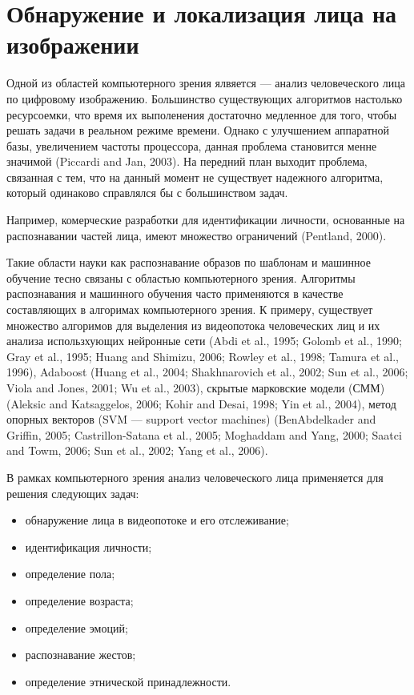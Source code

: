 \section{Обнаружение и локализация лица на изображении}
Одной из областей компьютерного зрения ялвяется --- анализ человеческого лица по цифровому изображению.
Большинство существующих алгоритмов настолько ресурсоемки, что время их выполенения достаточно медленное для того, чтобы решать задачи в реальном режиме времени.
Однако с улучшением аппаратной базы, увеличением частоты процессора, данная проблема становится менне значимой (Piccardi and Jan, 2003).
На передний план выходит проблема, связанная с тем, что на данный момент не существует надежного алгоритма, который одинаково справлялся бы с большинством задач.

Например, комерческие разработки для идентификации личности, основанные на распознавании частей лица, имеют множество ограничений (Pentland, 2000). 

Такие области науки как распознавание образов по шаблонам и машинное обучение тесно связаны с областью компьютерного зрения. Алгоритмы распознавания и машинного обучения часто применяются в качестве составляющих в алгоримах компьютерного зрения. К примеру, существует множество алгоримов для выделения из видеопотока человеческих лиц и их анализа использхующих нейронные сети (Abdi et al., 1995; Golomb et al., 1990; Gray et al., 1995; Huang and Shimizu, 2006; Rowley et al., 1998; Tamura et al., 1996), Adaboost (Huang et al., 2004; Shakhnarovich et al., 2002; Sun et al., 2006; Viola and Jones, 2001; Wu et al., 2003), скрытые марковские модели (СММ) (Aleksic and Katsaggelos, 2006; Kohir and Desai, 1998; Yin et al., 2004), метод опорных векторов (SVM — support vector machines) (BenAbdelkader and Griffin, 2005; Castrillon-Satana et al., 2005; Moghaddam and Yang, 2000; Saatci and Towm, 2006; Sun et al., 2002; Yang et al., 2006).

В рамках компьютерного зрения анализ человеческого лица применяется для решения следующих задач:


\begin{itemize}
	\item обнаружение лица в видеопотоке и его отслеживание;
	\item идентификация личности;
	\item определение пола;
	\item определение возраста;
	\item определение эмоций;
	\item распознавание жестов;
	\item определение этнической принадлежности.
\end{itemize}


